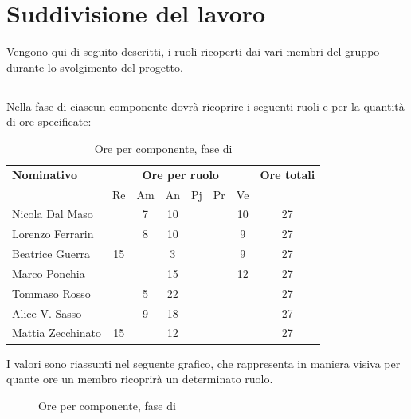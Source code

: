 \section{Suddivisione del lavoro}
Vengono qui di seguito descritti, i ruoli ricoperti dai vari membri del gruppo durante lo svolgimento del progetto.
\subsection{\AR}
Nella fase di \AR{} ciascun componente dovrà ricoprire i seguenti ruoli e per la quantità di ore specificate:

\begin{table}[H]
	\centering
	\begin{tabular}{|l|c|c|c|c|c|c|c|}
		\hline
		\textbf{Nominativo} & 
		\multicolumn{6}{c|}{\textbf{Ore per ruolo}} & 
		\textbf{Ore totali} \\
		& Re & Am & An & Pj & Pr & Ve & \\
		\hline
		Nicola Dal Maso & & 7 & 10 & & & 10 & 27 \\
		Lorenzo Ferrarin & & 8 & 10 & & & 9 & 27 \\
		Beatrice Guerra & 15 & & 3 & & & 9 & 27 \\
		Marco Ponchia & & & 15 & & & 12 & 27 \\
		Tommaso Rosso & & 5 & 22 & & & & 27 \\
		Alice V. Sasso & & 9 & 18 & & & & 27 \\
		Mattia Zecchinato & 15 & & 12 & & & & 27 \\
		\hline
	\end{tabular}
	\caption{Ore per componente, fase di \AR}
\end{table}
I valori sono riassunti nel seguente grafico, che rappresenta in maniera visiva per quante ore un membro ricoprirà un determinato ruolo.
\begin{figure}[H]
	\centering
	\caption{Ore per componente, fase di \AR}
\end{figure}


